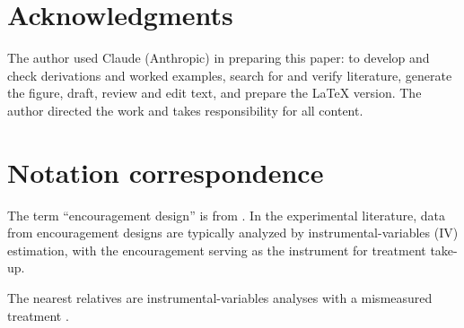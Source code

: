 \documentclass[11pt]{article}
\begin{document}
\section*{Acknowledgments}
The author used Claude (Anthropic) in preparing this paper: to develop and check derivations and worked examples, search for and verify literature, generate the figure, draft, review and edit text, and prepare the LaTeX version. The author directed the work and takes responsibility for all content.



\appendix
\section{Notation correspondence}
The term “encouragement design” is from \citet{holland1988causal}. In the experimental literature, data from encouragement designs are typically analyzed by instrumental-variables (IV) estimation, with the encouragement serving as the instrument for treatment take-up.

The nearest relatives are instrumental-variables analyses with a mismeasured treatment \citep{imai2010causal,battistin2014misreported,calvi2022late}.
\end{document}
